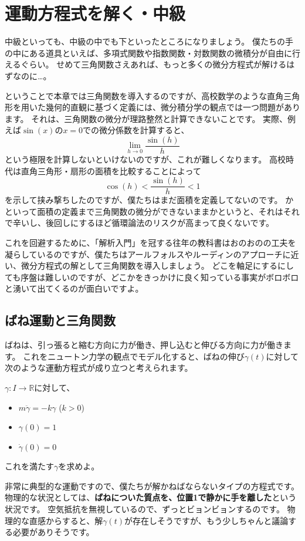 \chapter{運動方程式を解く・中級}

中級といっても、中級の中でも下といったところになりましょう。
僕たちの手の中にある道具といえば、多項式関数や指数関数・対数関数の微積分が自由に行えるぐらい。
せめて三角関数さえあれば、もっと多くの微分方程式が解けるはずなのに…。

ということで本章では三角関数を導入するのですが、高校数学のような直角三角形を用いた幾何的直観に基づく定義には、微分積分学の観点では一つ問題があります。
それは、三角関数の微分が理路整然と計算できないことです。
実際、例えば$\sin(x)$の$x=0$での微分係数を計算すると、
\[
  \lim_{h\to0}\frac{\sin(h)}{h}
\]
という極限を計算しないといけないのですが、これが難しくなります。
高校時代は直角三角形・扇形の面積を比較することによって
\[
  \cos(h)<\frac{\sin(h)}{h}<1
\]
を示して挟み撃ちしたのですが、僕たちはまだ面積を定義してないのです。
かといって面積の定義まで三角関数の微分ができないままかというと、それはそれで辛いし、後回しにするほど循環論法のリスクが高まって良くないです。

これを回避するために、「解析入門」を冠する往年の教科書はおのおのの工夫を凝らしているのですが、僕たちはアールフォルスやルーディンのアプローチに近い、微分方程式の解として三角関数を導入しましょう。
どこを軸足にするにしても序盤は難しいのですが、どこかをきっかけに良く知っている事実がボロボロと湧いて出てくるのが面白いですよ。



\section{ばね運動と三角関数}

ばねは、引っ張ると縮む方向に力が働き、押し込むと伸びる方向に力が働きます。
これをニュートン力学の観点でモデル化すると、ばねの伸び$\gamma(t)$に対して次のような運動方程式が成り立つと考えられます。
\begin{example}
  $\gamma:I\to\mathbb{R}$に対して、
  \begin{itemize}
    \item $m\ddot{\gamma}=-k\gamma$ ($k>0$)
    \item $\gamma(0)=1$
    \item $\dot\gamma(0)=0$
  \end{itemize}
  これを満たす$\gamma$を求めよ。
\end{example}

非常に典型的な運動ですので、僕たちが解かねばならないタイプの方程式です。
物理的な状況としては、\textbf{ばねについた質点を、位置1で静かに手を離した}という状況です。
空気抵抗を無視しているので、ずっとビョンビョンするのです。
物理的な直感からすると、解$\gamma(t)$が存在しそうですが、もう少しちゃんと議論する必要がありそうです。

